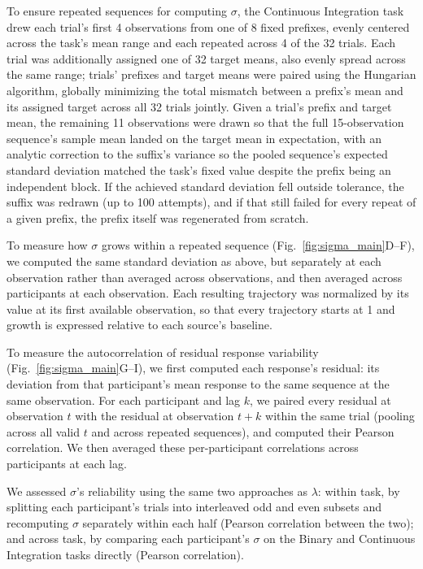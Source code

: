 \documentclass[12pt]{article}
\begin{document}
To ensure repeated sequences for computing $\sigma$, the Continuous Integration task drew each trial's first 4 observations from one of 8 fixed prefixes, evenly centered across the task's mean range and each repeated across 4 of the 32 trials. Each trial was additionally assigned one of 32 target means, also evenly spread across the same range; trials' prefixes and target means were paired using the Hungarian algorithm, globally minimizing the total mismatch between a prefix's mean and its assigned target across all 32 trials jointly. Given a trial's prefix and target mean, the remaining 11 observations were drawn so that the full 15-observation sequence's sample mean landed on the target mean in expectation, with an analytic correction to the suffix's variance so the pooled sequence's expected standard deviation matched the task's fixed value despite the prefix being an independent block. If the achieved standard deviation fell outside tolerance, the suffix was redrawn (up to 100 attempts), and if that still failed for every repeat of a given prefix, the prefix itself was regenerated from scratch.

To measure how $\sigma$ grows within a repeated sequence (Fig.~\ref{fig:sigma_main}D--F), we computed the same standard deviation as above, but separately at each observation rather than averaged across observations, and then averaged across participants at each observation. Each resulting trajectory was normalized by its value at its first available observation, so that every trajectory starts at 1 and growth is expressed relative to each source's baseline.

To measure the autocorrelation of residual response variability (Fig.~\ref{fig:sigma_main}G--I), we first computed each response's residual: its deviation from that participant's mean response to the same sequence at the same observation. For each participant and lag $k$, we paired every residual at observation $t$ with the residual at observation $t+k$ within the same trial (pooling across all valid $t$ and across repeated sequences), and computed their Pearson correlation. We then averaged these per-participant correlations across participants at each lag.

We assessed $\sigma$'s reliability using the same two approaches as $\lambda$: within task, by splitting each participant's trials into interleaved odd and even subsets and recomputing $\sigma$ separately within each half (Pearson correlation between the two); and across task, by comparing each participant's $\sigma$ on the Binary and Continuous Integration tasks directly (Pearson correlation).
\end{document}
